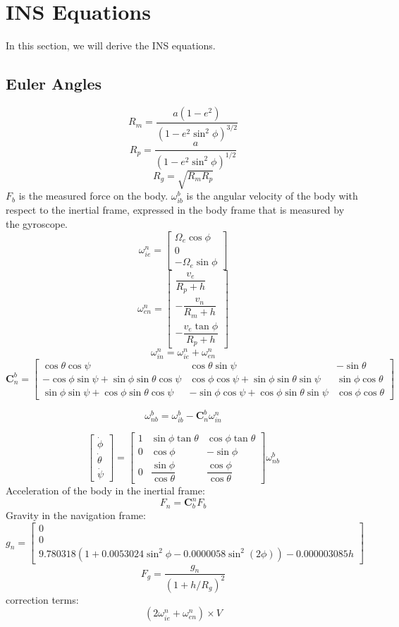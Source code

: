 \section{INS Equations}
In this section, we will derive the INS equations.
\subsection{Euler Angles}
\[
R_m = \dfrac{a(1-e^2)}{(1-e^2\sin^2\phi)^{3/2}}
\]
\[
    R_p = \dfrac{a}{(1-e^2\sin^2\phi)^{1/2}}
\]
\[
    R_g = \sqrt{R_m R_p}
\]
$F_b$ is the measured force on the body.
$\omega_{ib}^b$ is the angular velocity of the body with respect to the inertial frame, expressed in the body frame that is measured by the gyroscope.
\[
    \omega_{ie}^n = \begin{bmatrix}
        \Omega_e \cos\phi \\
        0 \\
        -\Omega_e \sin\phi
    \end{bmatrix}
\]
\[
    \omega_{en}^n = \begin{bmatrix}
        \dfrac{v_e}{R_p+h} \\[1em]
        -\dfrac{v_n}{R_m+h} \\[1em]
        -\dfrac{v_e\tan\phi}{R_p+h}
    \end{bmatrix}
\]
\[
    \omega_{in}^n = \omega_{ie}^n + \omega_{en}^n
\]
\[
    \bm{C}_n^b = \begin{bmatrix}
        \cos\theta\cos\psi & \cos\theta\sin\psi & -\sin\theta \\
        -\cos\phi\sin\psi+\sin\phi\sin\theta\cos\psi & \cos\phi\cos\psi+\sin\phi\sin\theta\sin\psi & \sin\phi\cos\theta \\
        \sin\phi\sin\psi+\cos\phi\sin\theta\cos\psi & -\sin\phi\cos\psi+\cos\phi\sin\theta\sin\psi & \cos\phi\cos\theta
    \end{bmatrix}
\]

\[
    \omega_{nb}^b = \omega_{ib}^b - \bm{C}_n^b \omega_{in}^n
\]

\[
    \begin{bmatrix}
        \dot{\phi} \\
        \dot{\theta} \\
        \dot{\psi}
    \end{bmatrix} = \begin{bmatrix}
        1 & \sin\phi\tan\theta & \cos\phi\tan\theta \\
        0 & \cos\phi & -\sin\phi \\
        0 & \dfrac{\sin\phi}{\cos\theta} & \dfrac{\cos\phi}{\cos\theta}
    \end{bmatrix} \omega_{nb}^b
\]
Acceleration of the body in the inertial frame:
\[
    F_n = \bm{C}_b^n F_b
\]
Gravity in the navigation frame:
\[
    g_n = \begin{bmatrix}
        0 \\
        0 \\
        9.780318(1+0.0053024\sin^2\phi-0.0000058\sin^2(2\phi)) - 0.000003085h
    \end{bmatrix}
\]
\[
    F_g = \dfrac{g_n}{(1 + h/R_g)^2} 
\]
correction terms:
\[
    (2\omega_{ie}^n + \omega_{en}^n) \times V
\]

